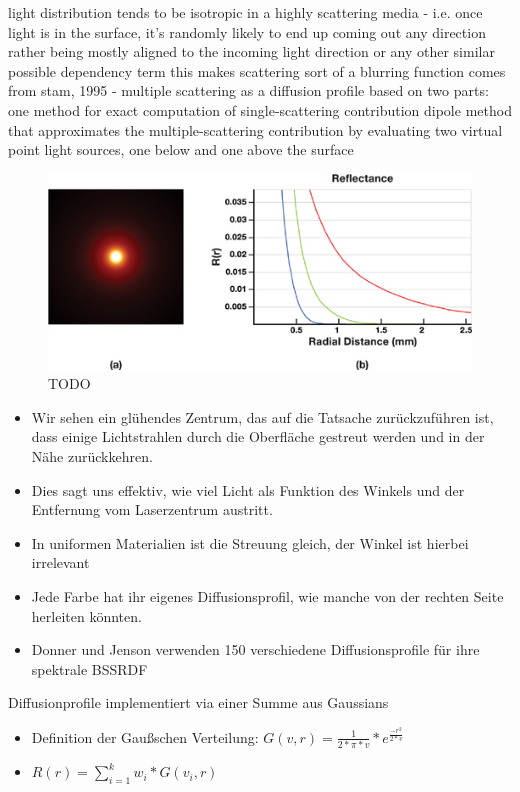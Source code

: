 \documentclass[ngerman,runningheads,a4paper]{llncs}[2018/03/10]
\begin{document}
light distribution tends to be isotropic in a highly scattering media - i.e. once light is in the surface, it's randomly likely to end up coming out any direction rather being mostly aligned to the incoming light direction or any other similar possible dependency term
this makes scattering sort of a blurring function
comes from stam, 1995 - multiple scattering as a diffusion profile
        based on two parts:
          one method for exact computation of single-scattering contribution
          dipole method that approximates the multiple-scattering contribution by evaluating two virtual point light sources, one below and one above the surface


\begin{figure}
\includegraphics[scale=1,keepaspectratio]{./images/diffusion-profile-visualization}
\caption{TODO}
\end{figure}

\begin{itemize}
  \item Wir sehen ein glühendes Zentrum, das auf die Tatsache zurückzuführen ist, dass einige Lichtstrahlen durch die Oberfläche gestreut werden und in der Nähe zurückkehren.
  \item Dies sagt uns effektiv, wie viel Licht als Funktion des Winkels und der Entfernung vom Laserzentrum austritt.
  \item In uniformen Materialien ist die Streuung gleich, der Winkel ist hierbei irrelevant
  \item Jede Farbe hat ihr eigenes Diffusionsprofil, wie manche von der rechten Seite herleiten könnten.
  \item Donner und Jenson verwenden 150 verschiedene Diffusionsprofile für ihre spektrale BSSRDF
\end{itemize}

Diffusionprofile implementiert via einer Summe aus Gaussians

\begin{itemize}
  \item Definition der Gaußschen Verteilung: $G(v, r) = \frac{1}{2 * \pi * v} * e^{\frac{-r^{2}}{2*v}}$
  \item $R(r) = \sum\nolimits_{i=1}^k w_i * G(v_i, r)$
\end{itemize}
\end{document}
